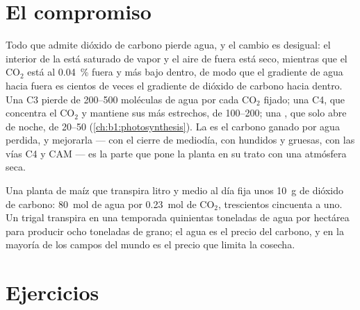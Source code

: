 \section{El compromiso}

\begin{proposition}\label{prop:b1:plant-transport:wue}
Todo  que admite dióxido de carbono pierde agua, y el cambio es
desigual: el interior de la  está saturado de vapor y el aire de fuera
está seco, mientras que el $\mathrm{CO_2}$ está al \qty{0.04}{\%} fuera y
más bajo dentro, de modo que el gradiente de agua hacia fuera es cientos de
veces el gradiente de dióxido de carbono hacia dentro. Una  C3 pierde de
\qtyrange{200}{500}{} moléculas de agua por cada $\mathrm{CO_2}$ fijado; una
 C4, que concentra el $\mathrm{CO_2}$ y mantiene sus  más
estrechos, de \qtyrange{100}{200}{}; una , que solo abre de noche,
de \qtyrange{20}{50}{} (\cref{ch:b1:photosynthesis}). La \emph{} es el carbono ganado por agua perdida, y mejorarla --- con
el cierre de mediodía, con  hundidos y  gruesas, con las
vías C4 y CAM --- es la parte que pone la planta en su trato con una
atmósfera seca.
\end{proposition}

\begin{example}\label{ex:b1:plant-transport:bargain}
Una planta de maíz que transpira litro y medio al día fija unos \qty{10}{g}
de dióxido de carbono: \qty{80}{mol} de agua por \qty{0.23}{mol} de
$\mathrm{CO_2}$, trescientos cincuenta a uno. Un trigal transpira en una
temporada quinientas toneladas de agua por hectárea para producir ocho
toneladas de grano; el agua es el precio del carbono, y en la mayoría de los
campos del mundo es el precio que limita la cosecha.
\end{example}

\section{Ejercicios}

